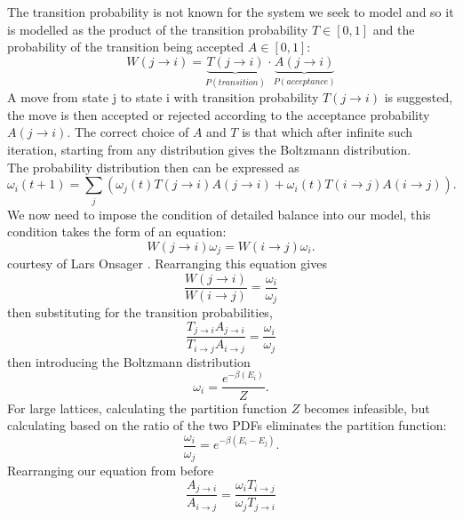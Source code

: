 \documentclass[10pt,a4paper]{article}
\begin{document}
The transition probability is not known for the system we seek to model and so it is modelled as the product of the transition probability $T \in[0,1]$ and the probability of the transition being accepted $A\in[0,1]$:
\begin{equation}
W(j\rightarrow i) = \underbrace{T(j\rightarrow i)}_{P(transition)}\cdot\underbrace{A(j\rightarrow i)}_{P(acceptance)}
\end{equation}
A move from state j to state i with transition probability $T(j\rightarrow i)$ is suggested, the move is then accepted or rejected according to the acceptance probability $A(j\rightarrow i)$. The correct choice of $A$ and $T$ is that which after infinite such iteration, starting from any distribution gives the Boltzmann distribution.\\The probability distribution then can be expressed as 
\begin{equation}
\omega_i(t+1) = \sum_j \left( \omega_j(t)T(j\rightarrow i)A(j\rightarrow i) + \omega_i(t)T(i\rightarrow j)A(i\rightarrow j) \right).
\end{equation}
We now need to impose the condition of detailed balance into our model, this condition takes the form of an equation:
\begin{equation}
W(j \rightarrow i)\omega_j = W(i \rightarrow j)\omega_i. 
\end{equation}
courtesy of Lars Onsager \cite{onsager1931reciprocal}.
Rearranging this equation gives
\begin{equation*}
\frac{W(j \rightarrow i)}{W(i \rightarrow j)} = \frac{\omega_i }{\omega_j }
\end{equation*}
then substituting for the transition probabilities, 
\begin{equation*}
\frac{T_{j\rightarrow i}A_{j\rightarrow i}}{T_{i\rightarrow j}A_{i\rightarrow j}} = \frac{\omega_i }{\omega_j }
\end{equation*}
then introducing the Boltzmann distribution
\begin{equation}
\omega_i = \frac{e^{-\beta(E_i)}}{Z}.
\end{equation}
For large lattices, calculating the partition function $Z$ becomes infeasible, but calculating based on the ratio of the two PDFs eliminates the partition function:
\begin{equation*}
\frac{\omega_i }{\omega_j } = e^{-\beta(E_i-E_j)}.
\end{equation*}
Rearranging our equation from before
\begin{equation*}
\frac{A_{j\rightarrow i}}{A_{i\rightarrow j}} = \frac{\omega_i T_{i\rightarrow j}}{\omega_j T_{j\rightarrow i}}
\end{equation*}
\end{document}
